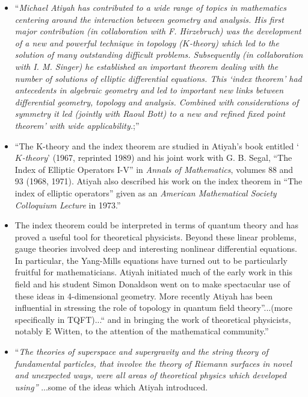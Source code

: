 \documentclass[12pt]{article}
\theoremstyle{plain}
\theoremstyle{definition}
\numberwithin{equation}{section}
\begin{document}
\begin{itemize}
\item ``{\em Michael Atiyah has contributed to a wide range of topics in mathematics centering around the interaction between geometry and analysis. His first major contribution (in collaboration with F. Hirzebruch) was the development of a new and powerful technique in topology ($K$-theory) which led to the solution of many outstanding difficult problems. Subsequently (in collaboration with I. M. Singer) he established an important theorem dealing with the number of solutions of elliptic differential equations. This `index theorem' had antecedents in algebraic geometry and led to important new links between differential geometry, topology and analysis. Combined with considerations of symmetry it led (jointly with Raoul Bott) to a new and refined fixed point theorem' with wide applicability.};'' 
\item ``The K-theory and the index theorem are studied in Atiyah's book entitled `{\em $K$-theory}' (1967, reprinted 1989) and his joint work with G. B. Segal, ``The Index of Elliptic Operators I-V'' in {\em Annals of Mathematics}, volumes 88 and 93 (1968, 1971). Atiyah also described his work on the index theorem in ``The index of elliptic operators'' given as an {\em American Mathematical Society Colloquium Lecture} in 1973.''
\item The index theorem could be interpreted in terms of quantum theory and has proved a useful tool for theoretical physicists. Beyond these linear problems, gauge theories involved deep and interesting nonlinear differential equations. In particular, the Yang-Mills equations have turned out to be particularly fruitful for mathematicians. Atiyah initiated much of the early work in this field and his student Simon Donaldson went on to make spectacular use of these ideas in 4-dimensional geometry. More recently Atiyah has been influential in stressing the role of topology in quantum field theory''...(more specifically in TQFT)...`` and in bringing the work of theoretical physicists, notably E Witten, to the attention of the mathematical community.'' 
\item ``{\em The theories of superspace and supergravity and the string theory of fundamental particles, that involve the theory of Riemann surfaces in novel and unexpected ways, were all areas of theoretical physics which developed using''} ...some of the ideas which Atiyah introduced.
\end{itemize}
\end{document}

